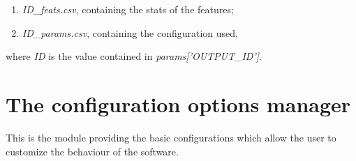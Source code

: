 \documentclass[letterpaper,10pt,english]{sphinxmanual}
\begin{document}
\begin{fulllineitems}
\begin{fulllineitems}
\begin{enumerate}
\item {} 
\emph{ID\_feats.csv}, containing the stats of the features;

\item {} 
\emph{ID\_params.csv}, containing the configuration used,

\end{enumerate}

where \emph{ID} is the value contained in \emph{params{[}'OUTPUT\_ID'{]}}.

\end{fulllineitems}


\end{fulllineitems}



\section{The configuration options manager}
\label{index:the-configuration-options-manager}
This is the module providing the basic configurations which allow the user to customize the behaviour of the software.
\label{index:module-config}
\end{document}
